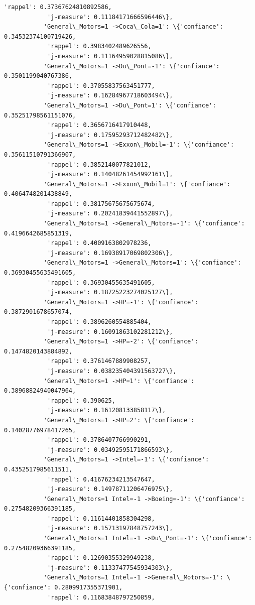 \documentclass[11pt]{article}
\begin{document}
\begin{Verbatim}[commandchars=\\\{\}]
            'rappel': 0.37367624810892586,
            'j-measure': 0.11184171666596446\},
           'General\_Motors=1 ->Coca\_Cola=1': \{'confiance': 0.34532374100719426,
            'rappel': 0.3983402489626556,
            'j-measure': 0.11164959028815086\},
           'General\_Motors=1 ->Du\_Pont=-1': \{'confiance': 0.3501199040767386,
            'rappel': 0.37055837563451777,
            'j-measure': 0.16284967718603494\},
           'General\_Motors=1 ->Du\_Pont=1': \{'confiance': 0.35251798561151076,
            'rappel': 0.3656716417910448,
            'j-measure': 0.17595293712482482\},
           'General\_Motors=1 ->Exxon\_Mobil=-1': \{'confiance': 0.35611510791366907,
            'rappel': 0.3852140077821012,
            'j-measure': 0.14048261454992161\},
           'General\_Motors=1 ->Exxon\_Mobil=1': \{'confiance': 0.4064748201438849,
            'rappel': 0.38175675675675674,
            'j-measure': 0.20241839441552897\},
           'General\_Motors=1 ->General\_Motors=-1': \{'confiance': 0.4196642685851319,
            'rappel': 0.4009163802978236,
            'j-measure': 0.16938917069802306\},
           'General\_Motors=1 ->General\_Motors=1': \{'confiance': 0.36930455635491605,
            'rappel': 0.36930455635491605,
            'j-measure': 0.18725223274025127\},
           'General\_Motors=1 ->HP=-1': \{'confiance': 0.3872901678657074,
            'rappel': 0.3896260554885404,
            'j-measure': 0.16091863102281212\},
           'General\_Motors=1 ->HP=-2': \{'confiance': 0.1474820143884892,
            'rappel': 0.3761467889908257,
            'j-measure': 0.038235404391563727\},
           'General\_Motors=1 ->HP=1': \{'confiance': 0.38968824940047964,
            'rappel': 0.390625,
            'j-measure': 0.161208133858117\},
           'General\_Motors=1 ->HP=2': \{'confiance': 0.14028776978417265,
            'rappel': 0.3786407766990291,
            'j-measure': 0.03492595171866593\},
           'General\_Motors=1 ->Intel=-1': \{'confiance': 0.4352517985611511,
            'rappel': 0.41676234213547647,
            'j-measure': 0.14978711206476975\},
           'General\_Motors=1 Intel=-1 ->Boeing=-1': \{'confiance': 0.27548209366391185,
            'rappel': 0.11614401858304298,
            'j-measure': 0.15713197848757243\},
           'General\_Motors=1 Intel=-1 ->Du\_Pont=-1': \{'confiance': 0.27548209366391185,
            'rappel': 0.12690355329949238,
            'j-measure': 0.11337477545934303\},
           'General\_Motors=1 Intel=-1 ->General\_Motors=-1': \{'confiance': 0.2809917355371901,
            'rappel': 0.11683848797250859,

\end{Verbatim}
\end{document}
